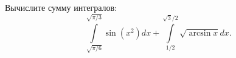 \documentclass{article}
\begin{document}
Вычислите сумму интегралов:
$$\int\limits_{\sqrt{\pi/6}}^{\sqrt{\pi/3}} \sin (x^2) dx + \int\limits_{1/2}^{\sqrt{3}/2} \sqrt{\arcsin x} dx.$$
\end{document}
